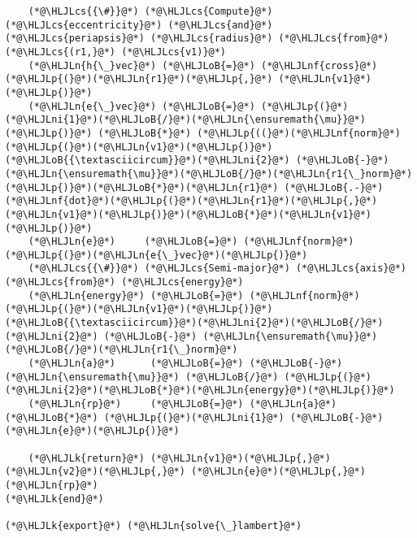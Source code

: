 \documentclass[12pt,a4paper]{article}
\newcommand{\HLJLk}[1]{\textcolor[RGB]{148,91,176}{\textbf{#1}}}
\newcommand{\HLJLn}[1]{#1}
\newcommand{\HLJLnf}[1]{\textcolor[RGB]{66,102,213}{#1}}
\newcommand{\HLJLni}[1]{\textcolor[RGB]{59,151,46}{#1}}
\newcommand{\HLJLoB}[1]{\textcolor[RGB]{102,102,102}{\textbf{#1}}}
\newcommand{\HLJLp}[1]{#1}
\newcommand{\HLJLcs}[1]{\textcolor[RGB]{153,153,119}{\textit{#1}}}
\begin{document}
\begin{lstlisting}
	(*@\HLJLcs{{\#}}@*) (*@\HLJLcs{Compute}@*) (*@\HLJLcs{eccentricity}@*) (*@\HLJLcs{and}@*) (*@\HLJLcs{periapsis}@*) (*@\HLJLcs{radius}@*) (*@\HLJLcs{from}@*) (*@\HLJLcs{(r1,}@*) (*@\HLJLcs{v1)}@*)
	(*@\HLJLn{h{\_}vec}@*) (*@\HLJLoB{=}@*) (*@\HLJLnf{cross}@*)(*@\HLJLp{(}@*)(*@\HLJLn{r1}@*)(*@\HLJLp{,}@*) (*@\HLJLn{v1}@*)(*@\HLJLp{)}@*)
	(*@\HLJLn{e{\_}vec}@*) (*@\HLJLoB{=}@*) (*@\HLJLp{(}@*)(*@\HLJLni{1}@*)(*@\HLJLoB{/}@*)(*@\HLJLn{\ensuremath{\mu}}@*)(*@\HLJLp{)}@*) (*@\HLJLoB{*}@*) (*@\HLJLp{((}@*)(*@\HLJLnf{norm}@*)(*@\HLJLp{(}@*)(*@\HLJLn{v1}@*)(*@\HLJLp{)}@*)(*@\HLJLoB{{\textasciicircum}}@*)(*@\HLJLni{2}@*) (*@\HLJLoB{-}@*) (*@\HLJLn{\ensuremath{\mu}}@*)(*@\HLJLoB{/}@*)(*@\HLJLn{r1{\_}norm}@*)(*@\HLJLp{)}@*)(*@\HLJLoB{*}@*)(*@\HLJLn{r1}@*) (*@\HLJLoB{.-}@*) (*@\HLJLnf{dot}@*)(*@\HLJLp{(}@*)(*@\HLJLn{r1}@*)(*@\HLJLp{,}@*)(*@\HLJLn{v1}@*)(*@\HLJLp{)}@*)(*@\HLJLoB{*}@*)(*@\HLJLn{v1}@*)(*@\HLJLp{)}@*)
	(*@\HLJLn{e}@*)     (*@\HLJLoB{=}@*) (*@\HLJLnf{norm}@*)(*@\HLJLp{(}@*)(*@\HLJLn{e{\_}vec}@*)(*@\HLJLp{)}@*)
	(*@\HLJLcs{{\#}}@*) (*@\HLJLcs{Semi-major}@*) (*@\HLJLcs{axis}@*) (*@\HLJLcs{from}@*) (*@\HLJLcs{energy}@*)
	(*@\HLJLn{energy}@*) (*@\HLJLoB{=}@*) (*@\HLJLnf{norm}@*)(*@\HLJLp{(}@*)(*@\HLJLn{v1}@*)(*@\HLJLp{)}@*)(*@\HLJLoB{{\textasciicircum}}@*)(*@\HLJLni{2}@*)(*@\HLJLoB{/}@*)(*@\HLJLni{2}@*) (*@\HLJLoB{-}@*) (*@\HLJLn{\ensuremath{\mu}}@*)(*@\HLJLoB{/}@*)(*@\HLJLn{r1{\_}norm}@*)
	(*@\HLJLn{a}@*)      (*@\HLJLoB{=}@*) (*@\HLJLoB{-}@*)(*@\HLJLn{\ensuremath{\mu}}@*) (*@\HLJLoB{/}@*) (*@\HLJLp{(}@*)(*@\HLJLni{2}@*)(*@\HLJLoB{*}@*)(*@\HLJLn{energy}@*)(*@\HLJLp{)}@*)
	(*@\HLJLn{rp}@*)     (*@\HLJLoB{=}@*) (*@\HLJLn{a}@*) (*@\HLJLoB{*}@*) (*@\HLJLp{(}@*)(*@\HLJLni{1}@*) (*@\HLJLoB{-}@*) (*@\HLJLn{e}@*)(*@\HLJLp{)}@*)

	(*@\HLJLk{return}@*) (*@\HLJLn{v1}@*)(*@\HLJLp{,}@*) (*@\HLJLn{v2}@*)(*@\HLJLp{,}@*) (*@\HLJLn{e}@*)(*@\HLJLp{,}@*) (*@\HLJLn{rp}@*)
(*@\HLJLk{end}@*)

(*@\HLJLk{export}@*) (*@\HLJLn{solve{\_}lambert}@*)
\end{lstlisting}
\end{document}
